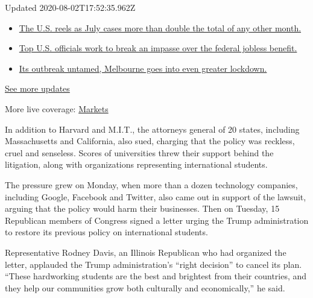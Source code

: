 Updated 2020-08-02T17:52:35.962Z

\begin{itemize}
\tightlist
\item
  \href{https://www.nytimes.com/2020/08/01/world/coronavirus-covid-19.html?action=click\&pgtype=Article\&state=default\&region=MAIN_CONTENT_1\&context=storylines_live_updates\#link-34047410}{The
  U.S. reels as July cases more than double the total of any other
  month.}
\item
  \href{https://www.nytimes.com/2020/08/01/world/coronavirus-covid-19.html?action=click\&pgtype=Article\&state=default\&region=MAIN_CONTENT_1\&context=storylines_live_updates\#link-780ec966}{Top
  U.S. officials work to break an impasse over the federal jobless
  benefit.}
\item
  \href{https://www.nytimes.com/2020/08/01/world/coronavirus-covid-19.html?action=click\&pgtype=Article\&state=default\&region=MAIN_CONTENT_1\&context=storylines_live_updates\#link-2bc8948}{Its
  outbreak untamed, Melbourne goes into even greater lockdown.}
\end{itemize}

\href{https://www.nytimes.com/2020/08/01/world/coronavirus-covid-19.html?action=click\&pgtype=Article\&state=default\&region=MAIN_CONTENT_1\&context=storylines_live_updates}{See
more updates}

More live coverage:
\href{https://www.nytimes.com/live/2020/07/31/business/stock-market-today-coronavirus?action=click\&pgtype=Article\&state=default\&region=MAIN_CONTENT_1\&context=storylines_live_updates}{Markets}

In addition to Harvard and M.I.T., the attorneys general of 20 states,
including Massachusetts and California, also sued, charging that the
policy was reckless, cruel and senseless. Scores of universities threw
their support behind the litigation, along with organizations
representing international students.

The pressure grew on Monday, when more than a dozen technology
companies, including Google, Facebook and Twitter, also came out in
support of the lawsuit, arguing that the policy would harm their
businesses. Then on Tuesday, 15 Republican members of Congress signed a
letter urging the Trump administration to restore its previous policy on
international students.

Representative Rodney Davis, an Illinois Republican who had organized
the letter, applauded the Trump administration's ``right decision'' to
cancel its plan. ``These hardworking students are the best and brightest
from their countries, and they help our communities grow both culturally
and economically,'' he said.

